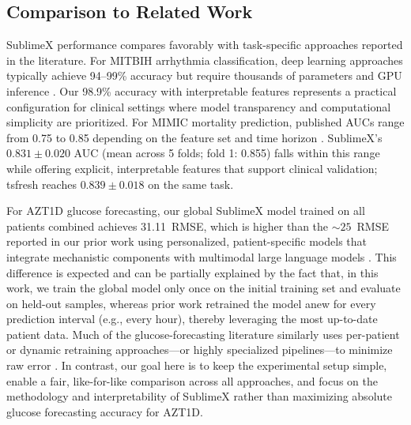 \documentclass[times, review, 10pt]{elsarticle}
\begin{document}
\subsection{Comparison to Related Work}

SublimeX performance compares favorably with task-specific approaches reported in the literature. For MITBIH arrhythmia classification, deep learning
approaches typically achieve 94--99\% accuracy but require thousands of parameters and GPU inference \cite{acharya2017ecg_deep, hannun2019cardiologist}.
Our 98.9\% accuracy with interpretable features represents a practical configuration for clinical settings where model transparency and computational
simplicity are prioritized. For MIMIC mortality prediction, published AUCs range from 0.75 to 0.85 depending on the feature set and time horizon
\cite{harutyunyan2019multitask, purushotham2018benchmarking}. SublimeX's $0.831 \pm 0.020$ AUC (mean across 5 folds; fold 1: 0.855) falls within this
range while offering explicit, interpretable features that support clinical validation;
tsfresh reaches $0.839 \pm 0.018$ on the same task.

For AZT1D glucose forecasting, our global SublimeX model trained on all patients combined achieves
31.11~RMSE, which is higher than the ${\sim}25$~RMSE reported in our prior work using
personalized, patient-specific models that integrate mechanistic components with multimodal large
language models \cite{wolber5261056multimodal}. This difference is expected and can be partially
explained by the fact that, in this work, we train the global model only once on the initial
training set and evaluate on held-out samples, whereas prior work retrained the model anew for
every prediction interval (e.g., every hour), thereby leveraging the most up-to-date patient data.
Much of the glucose-forecasting literature similarly uses per-patient or dynamic retraining
approaches---or highly specialized pipelines---to minimize raw error
\cite{woldaregay2019data}. In contrast, our goal here is to keep the experimental setup simple,
enable a fair, like-for-like comparison across all approaches, and focus on the methodology and
interpretability of SublimeX rather than maximizing absolute glucose forecasting accuracy for
AZT1D.
\end{document}
